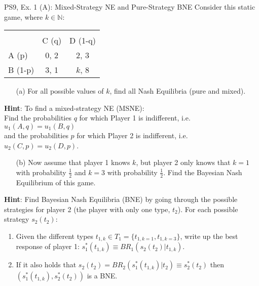 \begin{frame}{PS9, Ex. 1 (A): Mixed-Strategy NE and Pure-Strategy BNE}
    Consider this static game, where $k\in\mathbb{N}:$
    \vspace{-16pt}
    \begin{table}
      \begin{tabular}{l|c|c|}
        \multicolumn{1}{c}{} & \multicolumn{2}{c}{} \\
        \multicolumn{1}{c}{} & \multicolumn{1}{c}{C (q)} & \multicolumn{1}{c}{D (1-q)} \\\cline{2-3}
        A (p)   & 0, 2 & 2, 3 \\\cline{2-3}
        B (1-p) & 3, 1 & $k$, 8 \\\cline{2-3}
      \end{tabular}
    \end{table}
    \begin{itemize}
      \item[(a)] For all possible values of $k$, find all Nash Equilibria (pure and mixed).
    \end{itemize}
    \textbf{Hint}: To find a mixed-strategy NE (MSNE):\\
    Find the probabilities $q$ for which Player 1 is indifferent, i.e. $u_1(A,q)=u_1(B,q)$\\
    and the probabilities $p$ for which Player 2 is indifferent, i.e. $u_2(C,p)=u_2(D,p)$.
    \begin{itemize}
      \item[(b)] Now assume that player 1 knows $k$, but player 2 only knows that $k = 1$ with probability $\frac{1}{2}$ and $k = 3$ with probability $\frac{1}{2}$. Find the Bayesian Nash Equilibrium of this game.
    \end{itemize}
    \textbf{Hint}: Find Bayesian Nash Equilibria (BNE) by going through the possible strategies for player 2 (the player with only one type, $t_2$). For each possible strategy $s_2(t_2)$:
    \begin{enumerate}\normalsize
      \item Given the different types $t_{1,k}\in T_1=\{t_{1,k=1},t_{1,k=3}\}$, write up the best response of player 1: $s_1^*(t_{1,k})\equiv BR_1\left(s_2(t_2)|t_{1,k}\right)$.
      \item If it also holds that $s_2(t_2)=BR_2\left(s_1^*(t_{1,k})|t_2\right)\equiv s_2^*(t_2)$ then $\left(s_1^*(t_{1,k}),s_2^*(t_2)\right)$ is a BNE.
    \end{enumerate}
    \vfill\null
\end{frame}


